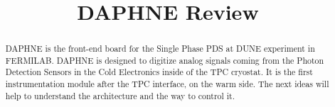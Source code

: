 \documentclass[final]{dune}
\title{DAPHNE Review}
\author{ }
\date{ }
\begin{document}
\maketitle

\begin{abstract}
DAPHNE is the front-end board for the Single Phase PDS at DUNE experiment in FERMILAB. DAPHNE is designed to digitize analog signals coming from the Photon Detection Sensors in the Cold Electronics inside of the TPC cryostat. It is the first instrumentation module after the TPC interface, on the warm side. The next ideas will help to understand the architecture and the way to control it.

\rm
\begin{adjustwidth}{2cm}{2cm} 

\end{adjustwidth}
\end{abstract}





%





%
\end{document}
